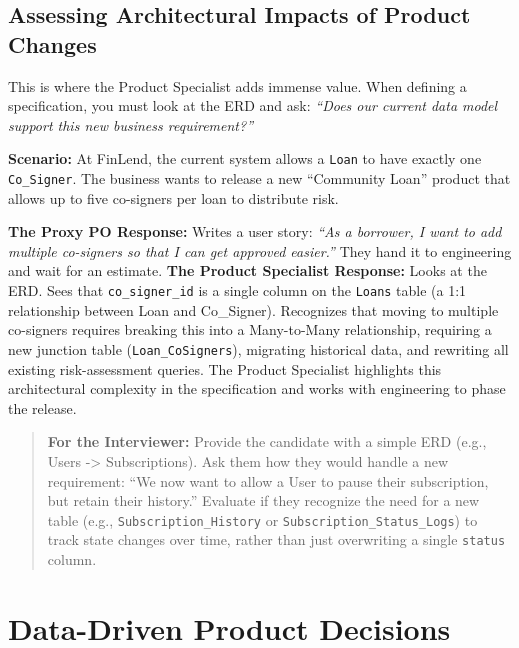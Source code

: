 \subsection{Assessing Architectural Impacts of Product
Changes}\label{assessing-architectural-impacts-of-product-changes}

This is where the Product Specialist adds immense value. When defining a
specification, you must look at the ERD and ask: \emph{``Does our
current data model support this new business requirement?''}

\textbf{Scenario:} At FinLend, the current system allows a \texttt{Loan}
to have exactly one \texttt{Co\_Signer}. The business wants to release a
new ``Community Loan'' product that allows up to five co-signers per
loan to distribute risk.

\textbf{The Proxy PO Response:} Writes a user story: \emph{``As a
borrower, I want to add multiple co-signers so that I can get approved
easier.''} They hand it to engineering and wait for an estimate.
\textbf{The Product Specialist Response:} Looks at the ERD. Sees that
\texttt{co\_signer\_id} is a single column on the \texttt{Loans} table
(a 1:1 relationship between Loan and Co\_Signer). Recognizes that moving
to multiple co-signers requires breaking this into a Many-to-Many
relationship, requiring a new junction table (\texttt{Loan\_CoSigners}),
migrating historical data, and rewriting all existing risk-assessment
queries. The Product Specialist highlights this architectural complexity
in the specification and works with engineering to phase the release.

\begin{quote}
\textbf{For the Interviewer:} Provide the candidate with a simple ERD
(e.g., Users -\textgreater{} Subscriptions). Ask them how they would
handle a new requirement: ``We now want to allow a User to pause their
subscription, but retain their history.'' Evaluate if they recognize the
need for a new table (e.g., \texttt{Subscription\_History} or
\texttt{Subscription\_Status\_Logs}) to track state changes over time,
rather than just overwriting a single \texttt{status} column.
\end{quote}

\bigskip

\section{Data-Driven Product
Decisions}\label{data-driven-product-decisions}

